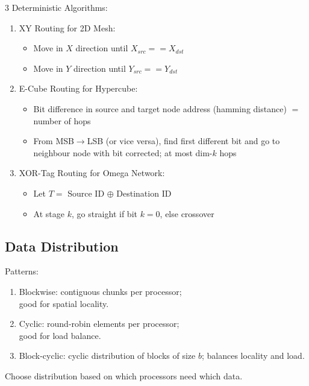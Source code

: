 \documentclass[12pt, a4paper]{article}
\begin{document}
\begin{multicols*}{3}
Deterministic Algorithms:
\begin{enumerate}[\roman*.]
  \item XY Routing for 2D Mesh: 
    \begin{itemize}[leftmargin=*]\vspace{3pt}
      \item Move in $X$ direction until $X_{src} == X_{dst}$
      \item Move in $Y$ direction until $Y_{src} == Y_{dst}$
    \end{itemize}
  \item E-Cube Routing for Hypercube:
    \begin{itemize}[leftmargin=*]\vspace{3pt}
      \item Bit difference in source and target node address (hamming distance) $=$ number of hops
      \item From MSB$\rightarrow$LSB (or vice versa), find first different bit and go to neighbour node with bit corrected; at most dim-$k$ hops
    \end{itemize}
  \item XOR-Tag Routing for Omega Network:
    \begin{itemize}[leftmargin=*]\vspace{3pt}
      \item Let $T = $ Source ID $\oplus$ Destination ID
      \item At stage $k$, go straight if bit $k = 0$, else crossover
    \end{itemize}
\end{enumerate}

\subsection{Data Distribution}

Patterns:
\begin{enumerate}[\roman*.]
  \item Blockwise: contiguous chunks per processor;\\ good for spatial locality.
  \item Cyclic: round-robin elements per processor;\\ good for load balance.
  \item Block-cyclic: cyclic distribution of blocks of size $b$; balances locality and load.
\end{enumerate}

Choose distribution based on which processors need which data.


\end{multicols*}
\end{document}
